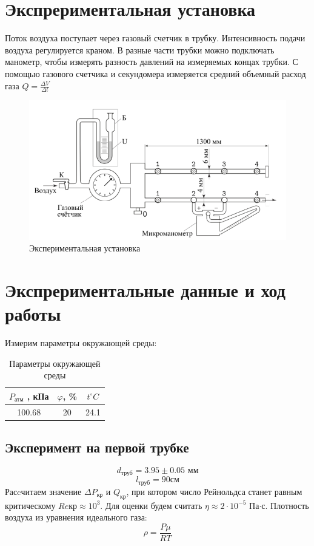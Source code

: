 \section*{Экспрериментальная установка}
\indent Поток воздуха поступает через газовый счетчик в трубку. Интенсивность подачи
воздуха регулируется краном. В разные части трубки можно подключать манометр,
чтобы измерять разность давлений на измеряемых концах трубки. С помощью
газового счетчика и секундомера измеряется средний объемный расход газа 
$Q = \frac{\Delta V}{\Delta t}$
\begin{figure}[h!]
    \centering
    \includegraphics[width=12cm]{setup.png}
    \caption{Экспериментальная установка}
    \label{fig:setup}
\end{figure}

\section*{Экспрериментальные данные и ход работы}
Измерим параметры окружающей среды:
\begin{table}[h]
    \centering
    \begin{tabular}{|c|c|c|}
        \hline
        $P_{\text{атм}}$ , кПа& $\varphi$, \% & $t^\circ C$ \\\hline
         100.68 & 20 & 24.1\\\hline
    \end{tabular}
    \caption{Параметры окружающей среды}
\end{table}
\subsection*{Эксперимент на первой трубке}
$$d_{\text{труб}} = 3.95 \pm 0.05 \text{ мм}$$
$$l_{\text{труб}} = 90 \text{см}$$
\indent Расcчитаем значение $\Delta P_{\text{кр}}$ и $Q_{\text{кр}}$, при котором число Рейнольдса
станет равным критическому $Re{\text{кр}} \approx 10^3$. Для оценки 
будем считать $\eta \approx 2\cdot 10^{-5}$ Па$\cdot$с. Плотность воздуха из 
уравнения идеального газа:
\begin{equation}
    \rho = \frac{P \mu}{R T}
\end{equation}

